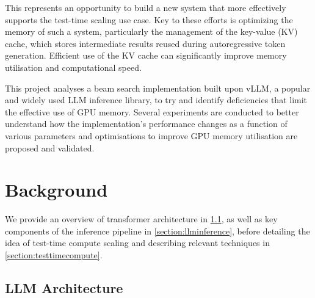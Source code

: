 \documentclass[12pt,twoside]{report}
\begin{document}
This represents an opportunity to build a new system that more effectively supports the test-time scaling use case.
Key to these efforts is optimizing the memory of such a system, particularly the management of the key-value (KV) cache, which stores intermediate results reused during autoregressive token generation. 
Efficient use of the KV cache can significantly improve memory utilisation and computational speed.

This project analyses a beam search implementation built upon vLLM, a popular and widely used LLM inference library, to try and identify deficiencies that limit the effective use of GPU memory. 
Several experiments are conducted to better understand how the implementation's performance changes as a function of various parameters and optimisations to improve GPU memory utilisation are proposed and validated. 


\chapter{Background} %
We provide an overview of transformer architecture in \ref{section:llmarchitecture}, as well as key components of the inference pipeline in \ref{section:llminference}, before detailing the idea of test-time compute scaling and describing relevant techniques in \ref{section:testtimecompute}.
\section{LLM Architecture}\label{section:llmarchitecture}
\end{document}
